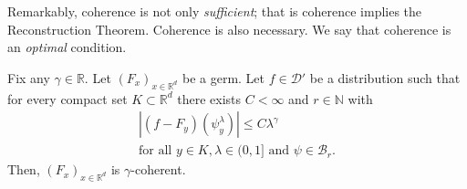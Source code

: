 Remarkably, coherence is not only \emph{sufficient}; that is coherence implies the Reconstruction Theorem. Coherence is also necessary. We say that coherence is an \emph{optimal} condition.

\begin{theorem}\label{theorem:coherence-is-necessary}
   Fix any \(\gamma \in \mathbb{R}\).  Let \({(F_x)}_{x \in \mathbb{R}^d}\) be a germ. Let \(f \in \mathcal{D}'\) be a distribution such that for every compact set \(K \subset \mathbb{R}^d\) there exists \(C < \infty\) and \(r \in \mathbb{N}\) with
   \begin{gather}\label{thm:coh-necessary}
        |(f-F_y)(\psi^\lambda_y)| \leq C \lambda^\gamma \\
        \text{for all \(y \in K, \lambda \in (0,1]\) and \(\psi \in \mathcal{B}_r\).} \nonumber
   \end{gather}
   Then, \({(F_x)}_{x \in \mathbb{R}^d}\) is \(\gamma\)-coherent.  
\end{theorem}

